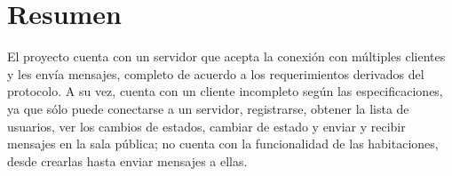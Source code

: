 \chapter{Resumen}

El proyecto cuenta con un servidor que acepta la conexión con múltiples clientes y les envía mensajes, completo de acuerdo a los requerimientos derivados del protocolo. A su vez, cuenta con un cliente incompleto según las especificaciones, ya que sólo puede conectarse a un servidor, registrarse, obtener la lista de usuarios, ver los cambios de estados, cambiar de estado y enviar y recibir mensajes en la sala pública; no cuenta con la funcionalidad de las habitaciones, desde crearlas hasta enviar mensajes a ellas.